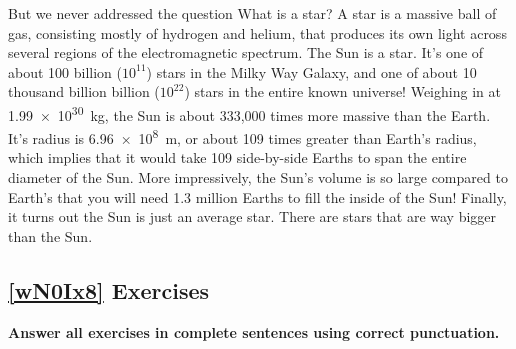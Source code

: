 \documentclass{article}
\numberwithin{equation}{section}
\numberwithin{figure}{section}
\begin{document}
\begin{center}
\end{center}

But we never addressed the question What is a star? A \gls{star} is a massive ball of gas, consisting mostly of hydrogen and helium, that produces its own light across several regions of the electromagnetic spectrum. The Sun is a star. It's one of about 100 billion ($10^{11}$) stars in the Milky Way Galaxy, and one of about 10 thousand billion billion ($10^{22}$) stars in the entire known universe! Weighing in at \SI{1.99e30}{kg}, the Sun is about 333,000 times more massive than the Earth. It's radius is \SI{6.96e8}{m}, or about 109 times greater than Earth's radius, which implies that it would take 109 side-by-side Earths to span the entire diameter of the Sun. More impressively, the Sun's volume is so large compared to Earth's that you will need 1.3 million Earths to fill the inside of the Sun! Finally, it turns out the Sun is just an average star. There are stars that are way bigger than the Sun.

\begin{center}
\end{center}

\clearpage
\subsection*{\ref{wN0Ix8} Exercises}
\textbf{Answer all exercises in complete sentences using correct punctuation.}
\end{document}
